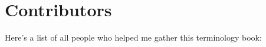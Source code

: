 \section{Contributors}
Here's a list of all people who helped me gather this terminology book:

\begin{multicols*}{2}
	

\end{multicols*}